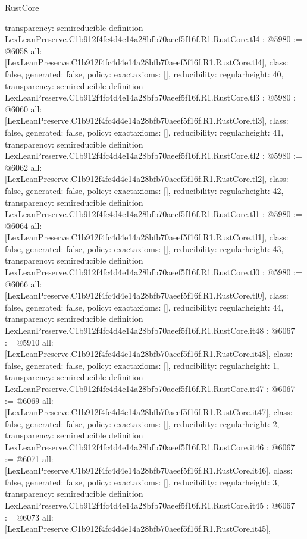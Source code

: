 \begin{lexlean}{RustCore}
\begin{coremodule}
{  transparency: semireducible
}
definition LexLeanPreserve.C1b912f4fc4d4e14a28bfb70aeef5f16f.R1.RustCore.tl4 : @5980 := @6058 {
  all: [LexLeanPreserve.C1b912f4fc4d4e14a28bfb70aeef5f16f.R1.RustCore.tl4],
  class: false,
  generated: false,
  policy: exact{axioms: []},
  reducibility: regular{height: 40},
  transparency: semireducible
}
definition LexLeanPreserve.C1b912f4fc4d4e14a28bfb70aeef5f16f.R1.RustCore.tl3 : @5980 := @6060 {
  all: [LexLeanPreserve.C1b912f4fc4d4e14a28bfb70aeef5f16f.R1.RustCore.tl3],
  class: false,
  generated: false,
  policy: exact{axioms: []},
  reducibility: regular{height: 41},
  transparency: semireducible
}
definition LexLeanPreserve.C1b912f4fc4d4e14a28bfb70aeef5f16f.R1.RustCore.tl2 : @5980 := @6062 {
  all: [LexLeanPreserve.C1b912f4fc4d4e14a28bfb70aeef5f16f.R1.RustCore.tl2],
  class: false,
  generated: false,
  policy: exact{axioms: []},
  reducibility: regular{height: 42},
  transparency: semireducible
}
definition LexLeanPreserve.C1b912f4fc4d4e14a28bfb70aeef5f16f.R1.RustCore.tl1 : @5980 := @6064 {
  all: [LexLeanPreserve.C1b912f4fc4d4e14a28bfb70aeef5f16f.R1.RustCore.tl1],
  class: false,
  generated: false,
  policy: exact{axioms: []},
  reducibility: regular{height: 43},
  transparency: semireducible
}
definition LexLeanPreserve.C1b912f4fc4d4e14a28bfb70aeef5f16f.R1.RustCore.tl0 : @5980 := @6066 {
  all: [LexLeanPreserve.C1b912f4fc4d4e14a28bfb70aeef5f16f.R1.RustCore.tl0],
  class: false,
  generated: false,
  policy: exact{axioms: []},
  reducibility: regular{height: 44},
  transparency: semireducible
}
definition LexLeanPreserve.C1b912f4fc4d4e14a28bfb70aeef5f16f.R1.RustCore.it48 : @6067 := @5910 {
  all: [LexLeanPreserve.C1b912f4fc4d4e14a28bfb70aeef5f16f.R1.RustCore.it48],
  class: false,
  generated: false,
  policy: exact{axioms: []},
  reducibility: regular{height: 1},
  transparency: semireducible
}
definition LexLeanPreserve.C1b912f4fc4d4e14a28bfb70aeef5f16f.R1.RustCore.it47 : @6067 := @6069 {
  all: [LexLeanPreserve.C1b912f4fc4d4e14a28bfb70aeef5f16f.R1.RustCore.it47],
  class: false,
  generated: false,
  policy: exact{axioms: []},
  reducibility: regular{height: 2},
  transparency: semireducible
}
definition LexLeanPreserve.C1b912f4fc4d4e14a28bfb70aeef5f16f.R1.RustCore.it46 : @6067 := @6071 {
  all: [LexLeanPreserve.C1b912f4fc4d4e14a28bfb70aeef5f16f.R1.RustCore.it46],
  class: false,
  generated: false,
  policy: exact{axioms: []},
  reducibility: regular{height: 3},
  transparency: semireducible
}
definition LexLeanPreserve.C1b912f4fc4d4e14a28bfb70aeef5f16f.R1.RustCore.it45 : @6067 := @6073 {
  all: [LexLeanPreserve.C1b912f4fc4d4e14a28bfb70aeef5f16f.R1.RustCore.it45],
}
\end{coremodule}
\end{lexlean}
